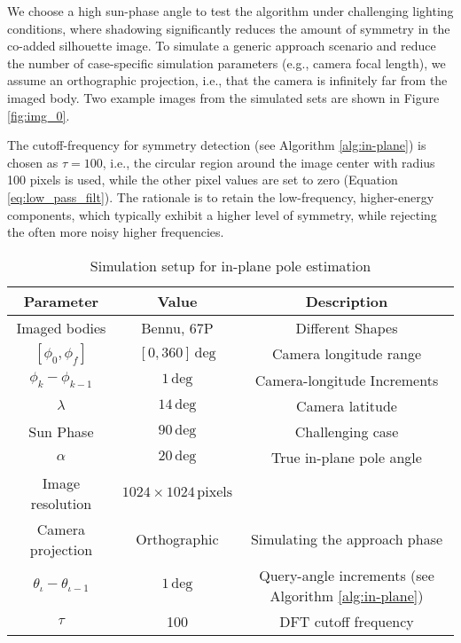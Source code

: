 We choose a high sun-phase angle to test the algorithm under challenging lighting conditions, where shadowing significantly reduces the amount of symmetry in the co-added silhouette image. To simulate a generic approach scenario and reduce the number of case-specific simulation parameters (e.g., camera focal length), we assume an orthographic projection, i.e., that the camera is infinitely far from the imaged body. Two example images from the simulated sets are shown in Figure \ref{fig:img_0}.

The cutoff-frequency for symmetry detection (see Algorithm \ref{alg:in-plane}) is chosen as $\tau=100$, i.e., the circular region around the image center with radius 100 pixels is used, while the other pixel values are set to zero (Equation \ref{eq:low_pass_filt}). The rationale is to retain the low-frequency, higher-energy components, which typically exhibit a higher level of symmetry, while rejecting the often more noisy higher frequencies.

\begin{table}[]
    \centering
    \caption{Simulation setup for in-plane pole estimation}
    \begin{tabular}{|c|c|c|}
        \hline
        Parameter & Value & Description\\
        \hline
        Imaged bodies & Bennu, 67P & Different Shapes\\
        $[\phi_0,\phi_f]$ & $[0,360]\,\mathrm{deg}$ & Camera longitude range\\
        $\phi_k-\phi_{k-1}$ & $1\,\mathrm{deg}$ & Camera-longitude Increments\\
        $\lambda$ & $14\,\mathrm{deg}$ & Camera latitude \\
        Sun Phase & $90\,\mathrm{deg}$ & Challenging case \\
        $\alpha$ & $20\,\mathrm{deg}$ & True in-plane pole angle\\
        Image resolution & $1024\times 1024\,\mathrm{pixels}$ & \\
        Camera projection & Orthographic & Simulating the approach phase\\
        $\theta_\iota - \theta_{\iota-1}$ & $1\,\mathrm{deg}$ & Query-angle increments (see Algorithm \ref{alg:in-plane})\\
        $\tau$ & 100 & DFT cutoff frequency\\
        \hline
    \end{tabular}
    \label{tab:params_images}
\end{table}

